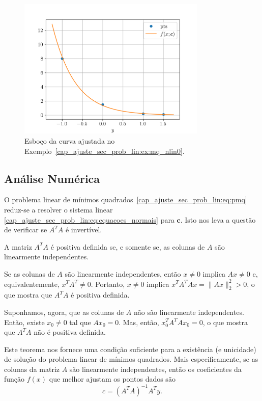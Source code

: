 \begin{ex}
\begin{figure}[H]
  \centering
  \includegraphics[width=0.8\textwidth]{cap_ajuste/dados/fig_mqUmPNLin/fig}
  \caption{Esboço da curva ajustada no Exemplo~\ref{cap_ajuste_sec_prob_lin:ex:mq_nlin0}.}
  \label{cap_ajuste_sec_prob_lin:fig:ex_mq_nlin0}
\end{figure}
\end{ex}

\subsection{Análise Numérica}

O problema linear de mínimos quadrados~\eqref{cap_ajuste_sec_prob_lin:eq:pmq} reduz-se a resolver o sistema linear \eqref{cap_ajuste_sec_prob_lin:eq:equacoes_normais} para $\pmb{c}$. Isto nos leva a questão de verificar se $A^TA$ é invertível.

\begin{teo}
  A matriz $A^TA$ é positiva definida se, e somente se, as colunas de $A$ são linearmente independentes.
\end{teo}
\begin{dem}
  Se as colunas de $A$ são linearmente independentes, então $x\neq 0$ implica $Ax\neq 0$ e, equivalentemente, $x^TA^T\neq 0$. Portanto, $x\neq 0$ implica $x^TA^TAx = \|Ax\|_2^2 > 0$, o que mostra que $A^TA$ é positiva definida.

  Suponhamos, agora, que as colunas de $A$ não são linearmente independentes. Então, existe $x_0\neq 0$ tal que $Ax_0 = 0$. Mas, então, $x_0^TA^TAx_0=0$, o que mostra que $A^TA$ não é positiva definida. 
\end{dem}

Este teorema nos fornece uma condição suficiente para a existência (e unicidade) de solução do problema linear de mínimos quadrados. Mais especificamente, se as colunas da matriz $A$ são linearmente independentes, então os coeficientes da função $f(x)$ que melhor ajustam os pontos dados são
\begin{equation}
  c = (A^TA)^{-1}A^Ty.
\end{equation}

